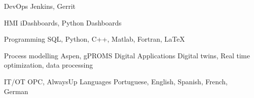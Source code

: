 

\begin{cvskills}

  \cvskill
    {DevOps} %
    {Jenkins, Gerrit} %


  \cvskill
    {HMI} %
    {iDashboards, Python Dashboards} %

  \cvskill
    {Programming} %
    {SQL, Python, C++, Matlab, Fortran, LaTeX} %

  \cvskill
    {Process modelling} %
    {Aspen, gPROMS} %
  \cvskill
    {Digital Applications} %
    {Digital twins, Real time optimization, data processing} %

  \cvskill
    {IT/OT} %
    {OPC, AlwaysUp} %
  \cvskill
    {Languages} %
    {Portuguese, English, Spanish, French, German} %

\end{cvskills}
